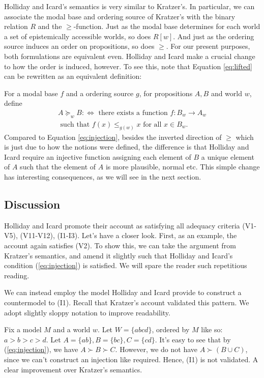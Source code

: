 \documentclass{article}
\theoremstyle{definition}
\begin{document}
Holliday and Icard's semantics is very similar to Kratzer's.
In particular, we can associate the modal base and ordering source of Kratzer's with the binary relation $R$ and the $\geq$-function.
Just as the modal base determines for each world a set of epistemically accessible worlds, so does $R[w]$.
And just as the ordering source induces an order on propositions, so does $\geq$.
For our present purposes, both formulations are equivalent even.
Holliday and Icard make a crucial change to how the order is induced, however.
To see this, note that Equation \ref{eq:lifted} can be rewritten as an equivalent definition:

For a modal base $f$ and a ordering source $g$, for propositions $A,B$ and world $w$, define
\begin{multline}
    \tag{2*}
    \label{eq:lifted-star}
    A \succeq_w B :\iff \text{ there exists a function } f: B_w \rightarrow A_w \\ \text{ such that } f(x) \leq_{g(w)} x \text{ for all } x \in B_w.
\end{multline}
Compared to Equation \ref{eq:injection}, besides the inverted direction of $\geq$ which is just due to how the notions were defined, the difference is that Holliday and Icard require an injective function assigning each element of $B$ a unique element of $A$ such that the element of $A$ is more plausible, normal etc.
This simple change has interesting consequences, as we will see in the next section. 
\subsection{Discussion}

Holliday and Icard promote their account as satisfying all adequacy criteria (V1-V5), (V11-V12), (I1-I3).
Let's have a closer look.
First, as an example, the account again satisfies (V2).
To show this, we can take the argument from Kratzer's semantics, and amend it slightly such that Holliday and Icard's condition (\ref{eq:injection}) is satisfied.  
We will spare the reader such repetitious reading. 

We can instead employ the model Holliday and Icard provide to construct a countermodel to (I1). Recall that Kratzer's account validated this pattern. We adopt slightly sloppy notation to improve readability.  

Fix a model $M$ and a world $w$. Let $W = \{abcd\}$, ordered by $M$ like so: $a > b > c > d$. Let $A = \{ab\}, B = \{bc\}, C = \{cd\}$. It's easy to see that by (\ref{eq:injection}), we have $A \succ B \succ C$. However, we do not have $A \succ (B \cup C)$, since we can't construct an injection like required. Hence, (I1) is not validated. A clear improvement over Kratzer's semantics.
\end{document}
